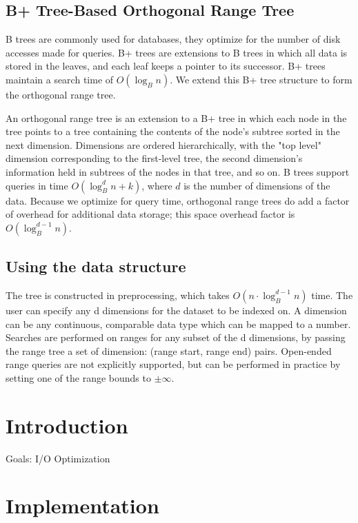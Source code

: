\documentclass[11pt, oneside]{article}
\begin{document}
\subsection{B+ Tree-Based Orthogonal Range Tree}
B trees are commonly used for databases, they optimize for the number of disk accesses made for queries. B+ trees are extensions to B trees in which all data is stored in the leaves, and each leaf keeps a pointer to its successor. B+ trees maintain a search time of $O(\log_B n)$. We extend this B+ tree structure to form the orthogonal range tree.

An orthogonal range tree is an extension to a B+ tree in which each node in the tree points to a tree containing the contents of the node's subtree sorted in the next dimension. Dimensions are ordered hierarchically, with the "top level" dimension corresponding to the first-level tree, the second  dimension's information held in subtrees of the nodes in that tree, and so on. B trees support queries in time $O(\log_B^d n + k)$, where $d$ is the number of dimensions of the data. Because we optimize for query time, orthogonal range trees do add a factor of overhead for additional data storage; this space overhead factor is $O(\log_B^{d-1} n)$.   
	
\subsection{Using the data structure}
The tree is constructed in preprocessing, which takes $O(n \cdot \log_B^{d-1} n)$ time. The user can specify any d dimensions for the dataset to be indexed on.
A dimension can be any continuous, comparable data type which can be mapped to a number.
Searches are performed on ranges for any subset of the d dimensions, by passing the range tree a set of {dimension: (range start, range end)} pairs. Open-ended range queries are not explicitly supported, but can be performed in practice by setting one of the range bounds to $\pm\infty$.




\section{Introduction}
Goals:
	I/O Optimization
    


\section{Implementation}
\end{document}
